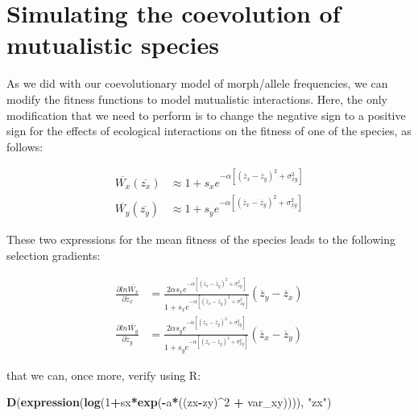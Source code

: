 \documentclass[
]{book}
\newenvironment{Shaded}{\begin{snugshade}}{\end{snugshade}}
\newcommand{\DecValTok}[1]{\textcolor[rgb]{0.00,0.00,0.81}{#1}}
\newcommand{\FunctionTok}[1]{\textcolor[rgb]{0.13,0.29,0.53}{\textbf{#1}}}
\newcommand{\NormalTok}[1]{#1}
\newcommand{\SpecialCharTok}[1]{\textcolor[rgb]{0.81,0.36,0.00}{\textbf{#1}}}
\newcommand{\StringTok}[1]{\textcolor[rgb]{0.31,0.60,0.02}{#1}}
\begin{document}
\hypertarget{simulating-the-coevolution-of-mutualistic-species}{%
\section{Simulating the coevolution of mutualistic species}\label{simulating-the-coevolution-of-mutualistic-species}}

As we did with our coevolutionary model of morph/allele frequencies, we can modify the fitness functions to model mutualistic interactions. Here, the only modification that we need to perform is to change the negative sign to a positive sign for the effects of ecological interactions on the fitness of one of the species, as follows:

\[\begin{aligned}
\overline{W_x}(\overline{z_{x}}) &\approx 1+s_{x}e^{-\alpha[(\overline{z}_x-\overline{z}_y)^2+\sigma^2_{xy}]} \\
\overline{W_y}(\overline{z_{y}}) &\approx 1+s_{y}e^{-\alpha[(\overline{z}_x-\overline{z}_y)^2+\sigma^2_{xy}]}
\end{aligned}\]

These two expressions for the mean fitness of the species leads to the following selection gradients:

\[\begin{aligned}
\frac{\partial ln\overline{W_x}}{\partial \overline{z}_x} &= \frac{2\alpha s_{x}e^{-\alpha[(\overline{z}_x-\overline{z}_y)^2+\sigma^2_{xy}]}}{1+s_{x}e^{-\alpha[(\overline{z}_x-\overline{z}_y)^2+\sigma^2_{xy}]}}(\overline{z}_y-\overline{z}_x) \\
\frac{\partial ln\overline{W_y}}{\partial \overline{z}_y} &= \frac{2\alpha s_{y}e^{-\alpha[(\overline{z}_x-\overline{z}_y)^2+\sigma^2_{xy}]}}{1+s_{y}e^{-\alpha[(\overline{z}_x-\overline{z}_y)^2+\sigma^2_{xy}]}}(\overline{z}_x-\overline{z}_y)
\end{aligned}\]

that we can, once more, verify using R:

\begin{Shaded}
\begin{Highlighting}[]
\FunctionTok{D}\NormalTok{(}\FunctionTok{expression}\NormalTok{(}\FunctionTok{log}\NormalTok{(}\DecValTok{1}\SpecialCharTok{+}\NormalTok{sx}\SpecialCharTok{*}\FunctionTok{exp}\NormalTok{(}\SpecialCharTok{{-}}\NormalTok{a}\SpecialCharTok{*}\NormalTok{((zx}\SpecialCharTok{{-}}\NormalTok{zy)}\SpecialCharTok{\^{}}\DecValTok{2} \SpecialCharTok{+}\NormalTok{ var\_xy)))), }\StringTok{"zx"}\NormalTok{)}
\end{Highlighting}
\end{Shaded}
\end{document}
